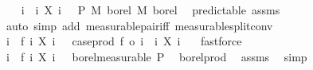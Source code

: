\begin{isabellebody}
%
\isadelimproof
%
\endisadelimproof
%
\isatagproof
{}\isamarkupfalse%
\isanewline
\ \ \isamarkupfalse%
\ {\isachardoublequoteopen}{\isacharparenleft}{\kern0pt}{\isasymlambda}{\isacharparenleft}{\kern0pt}i{\isacharcomma}{\kern0pt}\ {\isasymxi}{\isacharparenright}{\kern0pt}{\isachardot}{\kern0pt}\ {\isacharparenleft}{\kern0pt}i{\isacharcomma}{\kern0pt}\ X\ i\ {\isasymxi}{\isacharparenright}{\kern0pt}{\isacharparenright}{\kern0pt}\ {\isasymin}\ {\isasymSigma}\isactrlsub P\ {\isasymrightarrow}\isactrlsub M\ borel\ {\isasymOtimes}\isactrlsub M\ borel{\isachardoublequoteclose}\ \isamarkupfalse%
\ predictable\ assms{\isacharparenleft}{\kern0pt}{}{\isacharparenright}{\kern0pt}\ \isamarkupfalse%
\ {\isacharparenleft}{\kern0pt}auto\ simp\ add{\isacharcolon}{\kern0pt}\ measurable{\isacharunderscore}{\kern0pt}pair{\isacharunderscore}{\kern0pt}iff\ measurable{\isacharunderscore}{\kern0pt}split{\isacharunderscore}{\kern0pt}conv{\isacharparenright}{\kern0pt}\isanewline
\ \ \isamarkupfalse%
\ \isamarkupfalse%
\ {\isachardoublequoteopen}{\isacharparenleft}{\kern0pt}{\isasymlambda}{\isacharparenleft}{\kern0pt}i{\isacharcomma}{\kern0pt}\ {\isasymxi}{\isacharparenright}{\kern0pt}{\isachardot}{\kern0pt}\ f\ i\ {\isacharparenleft}{\kern0pt}X\ i\ {\isasymxi}{\isacharparenright}{\kern0pt}{\isacharparenright}{\kern0pt}\ {\isacharequal}{\kern0pt}\ case{\isacharunderscore}{\kern0pt}prod\ f\ o\ {\isacharparenleft}{\kern0pt}{\isasymlambda}{\isacharparenleft}{\kern0pt}i{\isacharcomma}{\kern0pt}\ {\isasymxi}{\isacharparenright}{\kern0pt}{\isachardot}{\kern0pt}\ {\isacharparenleft}{\kern0pt}i{\isacharcomma}{\kern0pt}\ X\ i\ {\isasymxi}{\isacharparenright}{\kern0pt}{\isacharparenright}{\kern0pt}{\isachardoublequoteclose}\ \isamarkupfalse%
\ fastforce\isanewline
\ \ \isamarkupfalse%
\ \isamarkupfalse%
\ {\isachardoublequoteopen}{\isacharparenleft}{\kern0pt}{\isasymlambda}{\isacharparenleft}{\kern0pt}i{\isacharcomma}{\kern0pt}\ {\isasymxi}{\isacharparenright}{\kern0pt}{\isachardot}{\kern0pt}\ f\ i\ {\isacharparenleft}{\kern0pt}X\ i\ {\isasymxi}{\isacharparenright}{\kern0pt}{\isacharparenright}{\kern0pt}\ {\isasymin}\ borel{\isacharunderscore}{\kern0pt}measurable\ {\isasymSigma}\isactrlsub P{\isachardoublequoteclose}\ \isamarkupfalse%
\ borel{\isacharunderscore}{\kern0pt}prod\ \isamarkupfalse%
\ assms\ \isamarkupfalse%
\ simp\isanewline
{}\isamarkupfalse%

\end{isabellebody}
